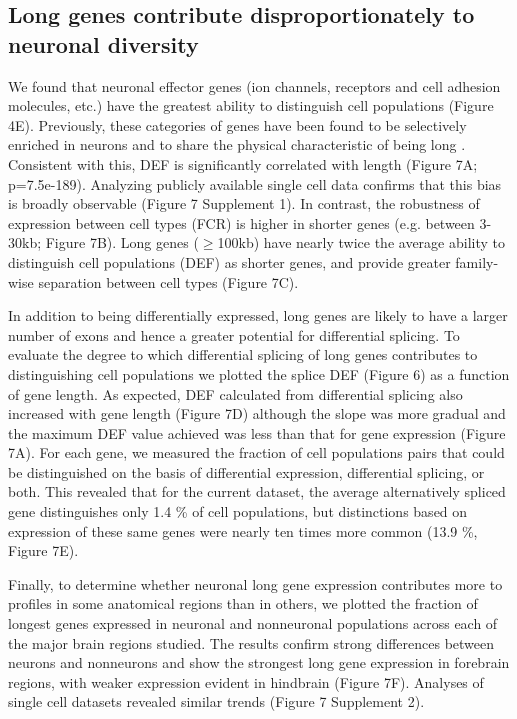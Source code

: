 \subsection{Long genes contribute disproportionately to neuronal diversity}

We found that neuronal effector genes (ion channels, receptors and cell adhesion molecules, etc.) have the greatest ability to distinguish cell populations (Figure 4E). Previously, these categories of genes have been found to be selectively enriched in neurons and to share the physical characteristic of being long \citep{Sugino_2014,Gabel_2015,Zylka_2015}. Consistent with this, DEF is significantly correlated with length (Figure 7A; p=7.5e-189). Analyzing publicly available single cell data confirms that this bias is broadly observable (Figure 7 Supplement 1). In contrast, the robustness of expression between cell types (FCR) is higher in shorter genes (e.g. between 3-30kb; Figure 7B). Long genes ($\geq$100kb) have nearly twice the average ability to distinguish cell populations (DEF) as shorter genes, and provide greater family-wise separation between cell types (Figure 7C).  

In addition to being differentially expressed, long genes are likely to have a larger number of exons and hence a greater potential for differential splicing. To evaluate the degree to which differential splicing of long genes contributes to distinguishing cell populations we plotted the splice DEF (Figure 6) as a function of gene length. As expected, DEF calculated from differential splicing also increased with gene length (Figure 7D) although the slope was more gradual and the maximum DEF value achieved was less than that for gene expression (Figure 7A). For each gene, we measured the fraction of cell populations pairs that could be distinguished on the basis of differential expression, differential splicing, or both. This revealed that for the current dataset, the average alternatively spliced gene distinguishes only 1.4 \% of cell populations, but distinctions based on expression of these same genes were nearly ten times more common (13.9 \%, Figure 7E). 

Finally, to determine whether neuronal long gene expression contributes more to profiles in some anatomical regions than in others, we plotted the fraction of longest genes expressed in neuronal and nonneuronal populations across each of the major brain regions studied. The results confirm strong differences between neurons and nonneurons and show the strongest long gene expression in forebrain regions, with weaker expression evident in hindbrain (Figure 7F). Analyses of single cell datasets revealed similar trends (Figure 7 Supplement 2). 


